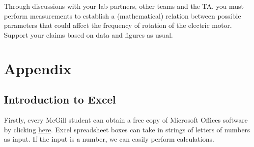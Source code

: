 \documentclass[12pt]{report}
\begin{document}
Through discussions with your lab partners, other teams and the TA, you must perform measurements to establish a (mathematical) relation between possible parameters that could affect the frequency of rotation of the electric motor. Support your claims based on data and figures as usual.

{}
\part*{Appendix} \label{Part:Appendix}

{}
\chapter*{Introduction to Excel}

Firstly, every McGill student can obtain a free copy of Microsoft Offices software by clicking \href{http://kb.mcgill.ca/kb/article?ArticleId=5172&source=Article&c=12&cid=2}{here}. Excel spreadsheet boxes can take in strings of letters of numbers as input. If the input is a number, we can easily perform calculations.\\
\end{document}
